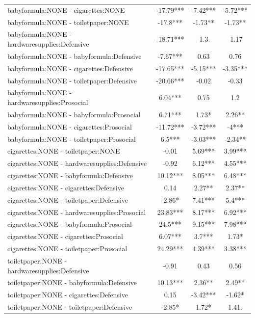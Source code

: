 \documentclass[]{report}
\begin{document}
\begin{longtable}{lccc}
			babyformula:NONE - cigarettes:NONE & -17.79*** & -7.42*** & -5.72*** \\ 
			babyformula:NONE - toiletpaper:NONE & -17.8*** & -1.73** & -1.73** \\ 
			babyformula:NONE - hardwaresupplies:Defensive & -18.71*** & -1.3. & -1.17 \\ 
			babyformula:NONE - babyformula:Defensive & -7.67*** & 0.63 & 0.76 \\ 
			babyformula:NONE - cigarettes:Defensive & -17.65*** & -5.15*** & -3.35*** \\ 
			babyformula:NONE - toiletpaper:Defensive & -20.66*** & -0.02 & -0.33 \\ 
			babyformula:NONE - hardwaresupplies:Prosocial & 6.04*** & 0.75 & 1.2 \\ 
			babyformula:NONE - babyformula:Prosocial & 6.71*** & 1.73* & 2.26** \\ 
			babyformula:NONE - cigarettes:Prosocial & -11.72*** & -3.72*** & -4*** \\ 
			babyformula:NONE - toiletpaper:Prosocial & 6.5*** & -3.03*** & -2.34** \\ 
			cigarettes:NONE - toiletpaper:NONE & -0.01 & 5.69*** & 3.99*** \\ 
			cigarettes:NONE - hardwaresupplies:Defensive & -0.92 & 6.12*** & 4.55*** \\ 
			cigarettes:NONE - babyformula:Defensive & 10.12*** & 8.05*** & 6.48*** \\ 
			cigarettes:NONE - cigarettes:Defensive & 0.14 & 2.27** & 2.37** \\ 
			cigarettes:NONE - toiletpaper:Defensive & -2.86* & 7.41*** & 5.4*** \\ 
			cigarettes:NONE - hardwaresupplies:Prosocial & 23.83*** & 8.17*** & 6.92*** \\ 
			cigarettes:NONE - babyformula:Prosocial & 24.5*** & 9.15*** & 7.98*** \\ 
			cigarettes:NONE - cigarettes:Prosocial & 6.07*** & 3.7*** & 1.73* \\ 
			cigarettes:NONE - toiletpaper:Prosocial & 24.29*** & 4.39*** & 3.38*** \\ 
			toiletpaper:NONE - hardwaresupplies:Defensive & -0.91 & 0.43 & 0.56 \\ 
			toiletpaper:NONE - babyformula:Defensive & 10.13*** & 2.36** & 2.49** \\ 
			toiletpaper:NONE - cigarettes:Defensive & 0.15 & -3.42*** & -1.62* \\ 
			toiletpaper:NONE - toiletpaper:Defensive & -2.85* & 1.72* & 1.41. \\ 

\end{longtable}
\end{document}
